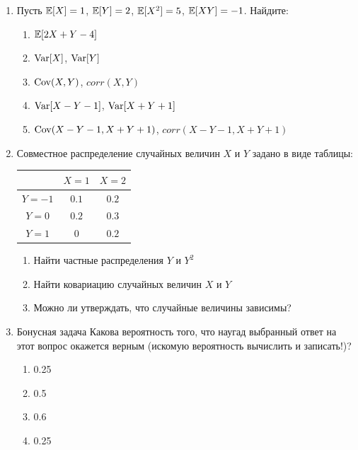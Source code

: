 \documentclass[12pt, a4paper]{article}\usepackage[]{graphicx}\usepackage[]{color}
\begin{document}
\begin{enumerate}
\item Пусть $\mathbb{E} [X] = 1$, $\mathbb{E} [Y] = 2$, $\mathbb{E} [X^2] = 5$, $\mathbb{E}[XY] = -1$. Найдите:
\begin{enumerate}
\item $\mathbb{E} [2X + Y - 4]$
\item $\operatorname{Var}[X]$, $\operatorname{Var}[Y]$
\item $\operatorname{Cov}(X,Y)$, $corr(X,Y)$
\item $\operatorname{Var}[X-Y-1]$,  $\operatorname{Var}[X+Y+1]$
\item $\operatorname{Cov}(X-Y-1, X+Y+1)$,  $corr(X-Y-1, X+Y+1)$
\end{enumerate}

\item Совместное распределение случайных величин $X$ и $Y$ задано в виде таблицы:

\begin{table}
\begin{tabular}{|c|c|c|}
\hline
 & $X=1$ & $X=2$ \\ \hline
$Y=-1$ & $0.1$ & $0.2$ \\ \hline
$Y=0$ & $0.2$ & $0.3$ \\ \hline
$Y=1$ & $0$ & $0.2$ \\ \hline
\end{tabular}
\end{table}

\begin{enumerate}
\item Найти частные распределения $Y$ и $Y^2$
\item Найти ковариацию случайных величин $X$ и $Y$
\item Можно ли утверждать, что случайные величины зависимы?
\end{enumerate}

\item{Бонусная задача}
Какова вероятность того, что наугад выбранный ответ на этот вопрос окажется верным (искомую вероятность вычислить и записать!)?
\begin{enumerate}
\item 0.25
\item 0.5
\item 0.6
\item 0.25
\end{enumerate}

\end{enumerate}
\end{document}
